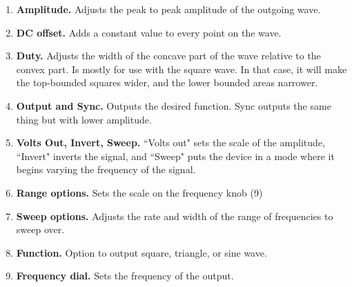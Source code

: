 \begin{enumerate}
\item \textbf{Amplitude.} Adjusts the peak to peak amplitude of the outgoing wave.
\item \textbf{DC offset.} Adds a constant value to every point on the wave.
\item \textbf{Duty.} Adjusts the width of the concave part of the wave relative to the convex part. Is mostly for use with the square wave. In that case, it will make the top-bounded squares wider, and the lower bounded areas narrower.
\item \textbf{Output and Sync.} Outputs the desired function. Sync outputs the same thing but with lower amplitude.
\item \textbf{Volts Out, Invert, Sweep.} ``Volts out" sets the scale of the amplitude, ``Invert" inverts the signal, and ``Sweep" puts the device in a mode where it begins varying the frequency of the signal.
\item \textbf{Range options.} Sets the scale on the frequency knob (9)
\item \textbf{Sweep options.} Adjusts the rate and width of the range of frequencies to sweep over.
\item \textbf{Function.} Option to output square, triangle, or sine wave.
\item \textbf{Frequency dial.} Sets the frequency of the output.
\end{enumerate}

\newpage
\thispagestyle{plain}
